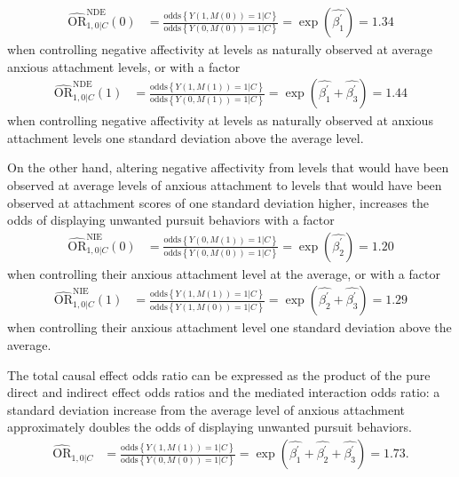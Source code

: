 \documentclass[nojss]{jss}
\begin{document}
\begin{align*}
\widehat{\mbox{OR}}^{\text{NDE}}_{1,0|C}(0) &= \frac{\mbox{odds}\left\{Y(1,M(0))=1|C\right\}}{\mbox{odds}\left\{Y(0,M(0))=1|C\right\}} = \exp(\hat{\beta_1^\prime}) = 1.34
\end{align*}
when controlling negative affectivity at levels as naturally observed at average anxious attachment levels, or with a factor
\begin{align*}
\widehat{\mbox{OR}}^{\text{NDE}}_{1,0|C}(1) &= \frac{\mbox{odds}\left\{Y(1,M(1))=1|C\right\}}{\mbox{odds}\left\{Y(0,M(1))=1|C\right\}} = \exp(\hat{\beta_1^\prime} + \hat{\beta_3^\prime}) = 1.44
\end{align*}
when controlling negative affectivity at levels as naturally observed at anxious attachment levels one standard deviation above the average level.
\par On the other hand, altering negative affectivity from levels that would have been observed at average levels of anxious attachment to levels that would have been observed at attachment scores of one standard deviation higher, increases the odds of displaying unwanted pursuit behaviors with a factor
\begin{align*}
\widehat{\mbox{OR}}^{\text{NIE}}_{1,0|C}(0) &= \frac{\mbox{odds}\left\{Y(0,M(1))=1|C\right\}}{\mbox{odds}\left\{Y(0,M(0))=1|C\right\}} = \exp(\hat{\beta_2^\prime}) = 1.20
\end{align*}
when controlling their anxious attachment level at the average, or with a factor
\begin{align*}
\widehat{\mbox{OR}}^{\text{NIE}}_{1,0|C}(1) &= \frac{\mbox{odds}\left\{Y(1,M(1))=1|C\right\}}{\mbox{odds}\left\{Y(1,M(0))=1|C\right\}} = \exp(\hat{\beta_2^\prime} + \hat{\beta_3^\prime}) = 1.29
\end{align*}
when controlling their anxious attachment level one standard deviation above the average.
\par The total causal effect odds ratio can be expressed as the product of the pure direct and indirect effect odds ratios and the mediated interaction odds ratio: a standard deviation increase from the average level of anxious attachment approximately doubles the odds of displaying unwanted pursuit behaviors.
\begin{align*}
\widehat{\mbox{OR}}_{1,0|C} &= \frac{\mbox{odds}\left\{Y(1,M(1))=1|C\right\}}{\mbox{odds}\left\{Y(0,M(0))=1|C\right\}} = \exp(\hat{\beta_1^\prime} + \hat{\beta_2^\prime} + \hat{\beta_3^\prime}) = 1.73.
\end{align*}
\end{document}
